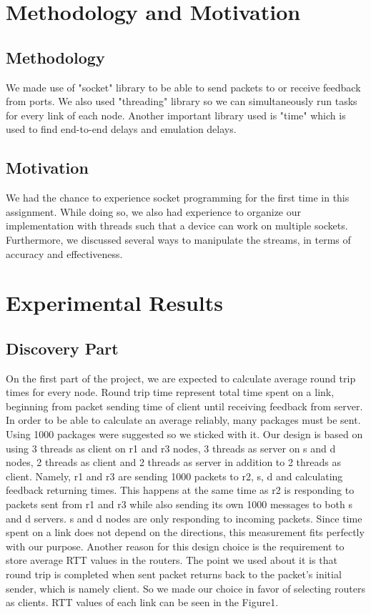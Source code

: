 \documentclass[conference]{IEEEtran}
\begin{document}
\section{Methodology and Motivation}

\subsection{Methodology}

We made use of "socket" library to be able to send packets to or receive feedback from ports. We also used "threading" library so we can simultaneously run tasks for every link of each node. Another important library used is "time" which is used to find end-to-end delays and emulation delays. 

\subsection{Motivation}

We had the chance to experience socket programming for the first time in this assignment. While doing so, we also had experience to organize our implementation with threads such that a device can work on multiple sockets. Furthermore, we discussed several ways to manipulate the streams, in terms of accuracy and effectiveness.

\section{Experimental Results}

\subsection{Discovery Part}\label{AA}

On the first part of the project, we are expected to calculate average round trip times for every node. Round trip time represent total time spent on a link, beginning from packet sending time of client until receiving feedback from server. In order to be able to calculate an average reliably, many packages must be sent. Using 1000 packages were suggested so we sticked with it. Our design is based on using 3 threads as client on r1 and r3 nodes, 3 threads as server on s and d nodes, 2 threads as client and 2 threads as server in addition to 2 threads as client. Namely, r1 and r3 are sending 1000 packets to r2, s, d and calculating feedback returning times. This happens at the same time as r2 is responding to packets sent from r1 and r3 while also sending its own 1000 messages to both s and d servers. s and d nodes are only responding to incoming packets. Since time spent on a link does not depend on the directions, this measurement fits perfectly with our purpose. Another reason for this design choice is the requirement to store average RTT values in the routers. The point we used about it is that round trip is completed when sent packet returns back to the packet's initial sender, which is namely client. So we made our choice in favor of selecting routers as clients. RTT values of each link can be seen in the Figure1.
\end{document}

